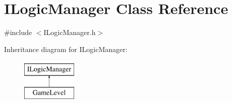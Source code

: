 \hypertarget{class_i_logic_manager}{}\section{I\+Logic\+Manager Class Reference}
\label{class_i_logic_manager}


{\ttfamily \#include $<$I\+Logic\+Manager.\+h$>$}

Inheritance diagram for I\+Logic\+Manager\+:\begin{figure}[H]
\begin{center}
\leavevmode
\includegraphics[height=2.000000cm]{class_i_logic_manager}
\end{center}
\end{figure}
